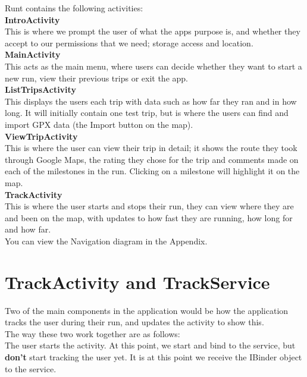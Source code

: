 \documentclass[11pt]{article}
\begin{document}
Runt contains the following activities: \\

\textbf{IntroActivity}\\
This is where we prompt the user of what the apps purpose is, and whether they accept to our permissions that we need; storage access and location. \\

\textbf{MainActivity} \\
This acts as the main menu, where users can decide whether they want to start a new run, view their previous trips or exit the app. \\

\textbf{ListTripsActivity} \\
This displays the users each trip with data such as how far they ran and in how long. It will initially contain one test trip, but is where the users can find and import GPX data (the Import button on the map).\\

\textbf{ViewTripActivity} \\
This is where the user can view their trip in detail; it shows the route they took through Google Maps, the rating they chose for the trip and comments made on each of the milestones in the run. Clicking on a milestone will highlight it on the map. \\

\textbf{TrackActivity} \\
This is where the user starts and stops their run, they can view where they are and been on the map, with updates to how fast they are running, how long for and how far.\\

You can view the Navigation diagram in the Appendix.


\newpage

\section{TrackActivity and TrackService}

Two of the main components in the application would be how the application tracks the user during their run, and updates the activity to show this.  \\
The way these two work together are as follows: \\

The user starts the activity. At this point, we start and bind to the service, but \textbf{don't} start tracking the user yet. It is at this point we receive the IBinder object to the service.\\ 
\end{document}
